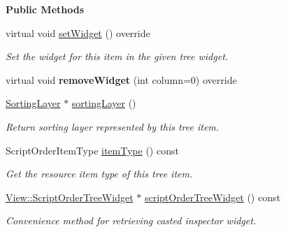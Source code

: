 \begin{Indent}\textbf{ Public Methods}\par
\begin{DoxyCompactItemize}
\item 
virtual void \mbox{\hyperlink{classrev_1_1_view_1_1_script_order_item_a1bdbd86e1f9e909818b5389266151024}{set\+Widget}} () override
\begin{DoxyCompactList}\small\item\em Set the widget for this item in the given tree widget. \end{DoxyCompactList}\item 
\mbox{\label{classrev_1_1_view_1_1_script_order_item_a70dc466016ba0c6c1476bb2075191d83}} 
virtual void {\bfseries remove\+Widget} (int column=0) override
\item 
\mbox{\label{classrev_1_1_view_1_1_script_order_item_a5a7ff9b557ad8742808a69997e35991a}} 
\mbox{\hyperlink{structrev_1_1_sorting_layer}{Sorting\+Layer}} $\ast$ \mbox{\hyperlink{classrev_1_1_view_1_1_script_order_item_a5a7ff9b557ad8742808a69997e35991a}{sorting\+Layer}} ()
\begin{DoxyCompactList}\small\item\em Return sorting layer represented by this tree item. \end{DoxyCompactList}\item 
\mbox{\label{classrev_1_1_view_1_1_script_order_item_a85eb1271c310b5932bac2cd8d2e19f4c}} 
Script\+Order\+Item\+Type \mbox{\hyperlink{classrev_1_1_view_1_1_script_order_item_a85eb1271c310b5932bac2cd8d2e19f4c}{item\+Type}} () const
\begin{DoxyCompactList}\small\item\em Get the resource item type of this tree item. \end{DoxyCompactList}\item 
\mbox{\label{classrev_1_1_view_1_1_script_order_item_a1eb654800915f70e1c6460ff4da4dbbe}} 
\mbox{\hyperlink{classrev_1_1_view_1_1_script_order_tree_widget}{View\+::\+Script\+Order\+Tree\+Widget}} $\ast$ \mbox{\hyperlink{classrev_1_1_view_1_1_script_order_item_a1eb654800915f70e1c6460ff4da4dbbe}{script\+Order\+Tree\+Widget}} () const
\begin{DoxyCompactList}\small\item\em Convenience method for retrieving casted inspector widget. \end{DoxyCompactList}\end{DoxyCompactItemize}
\end{Indent}
